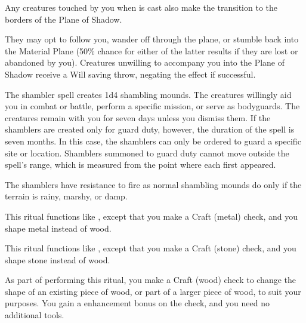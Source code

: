 \par Any creatures touched by you when  is cast also make the transition to the borders of the Plane of Shadow.
\par They may opt to follow you, wander off through the plane, or stumble back into the Material Plane (50\% chance for either of the latter results if they are lost or abandoned by you). Creatures unwilling to accompany you into the Plane of Shadow receive a Will saving throw, negating the effect if successful.

\spelleffect The shambler spell creates 1d4 shambling mounds. The creatures willingly aid you in combat or battle, perform a specific mission, or serve as bodyguards. The creatures remain with you for seven days unless you dismiss them. If the shamblers are created only for guard duty, however, the duration of the spell is seven months. In this case, the shamblers can only be ordered to guard a specific site or location. Shamblers summoned to guard duty cannot move outside the spell's range, which is measured from the point where each first appeared. 
\par The shamblers have resistance to fire as normal shambling mounds do only if the terrain is rainy, marshy, or damp.

\spelleffect This ritual functions like , except that you make a Craft (metal) check, and you shape metal instead of wood. 

\spelleffect This ritual functions like , except that you make a Craft (stone) check, and you shape stone instead of wood.

\spelleffect As part of performing this ritual, you make a Craft (wood) check to change the shape of an existing piece of wood, or part of a larger piece of wood, to suit your purposes. You gain a  enhancement bonus on the check, and you need no additional tools.

